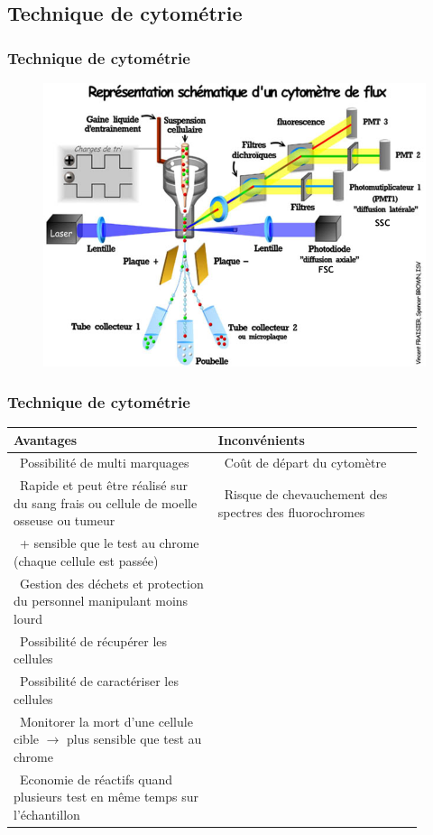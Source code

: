 \documentclass[12pt]{beamer}
\begin{document}
\subsection{Technique de cytométrie}

\begin{frame}
  \transuncover
  \frametitle{Technique de cytométrie}
  
  \begin{figure}
  	\includegraphics[width=0.7\linewidth]{cef.png}
  \end{figure}


\end{frame}

\begin{frame}
	\frametitle{Technique de cytométrie}
	{\scriptsize
\begin{tabular}{|p{0.45\linewidth}|p{0.45\linewidth}|}
	\hline
	Avantages & Inconvénients\\
	\hline
	\hline
	\textbullet~Possibilité de multi marquages & \textbullet~Coût de départ du cytomètre \\ 
	\textbullet~Rapide et peut être réalisé sur du sang frais ou cellule de moelle osseuse ou tumeur & \textbullet~Risque de chevauchement des spectres des fluorochromes \\ 
	\textbullet~+ sensible que le test au chrome (chaque cellule est passée) &  \\ 
	\textbullet~Gestion des déchets et protection du personnel manipulant moins lourd &  \\ 
	\textbullet~Possibilité de récupérer les cellules &  \\ 
	\textbullet~Possibilité de caractériser les cellules &  \\ 
	\textbullet~Monitorer la mort d’une cellule cible $ \rightarrow $ plus sensible que test au chrome &  \\ 
	\textbullet~Economie de réactifs quand plusieurs test en même temps sur l'échantillon & \\
	\hline
	
\end{tabular} 
}
\end{frame}
\end{document}
